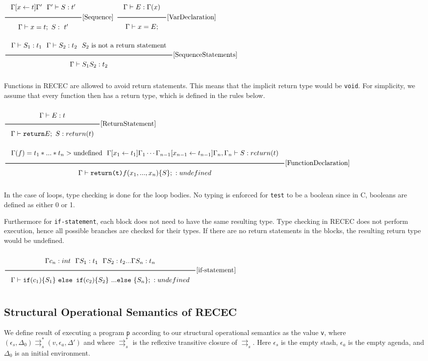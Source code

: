 \documentclass[a4paper]{article}
\newcommand{\RuleWithName}[3]{\genfrac{}{}{0.7pt}{}{{\setlength{\fboxrule}{0pt}\setlength{\fboxsep}{3mm}\fbox{$#1$}}}{{\setlength{\fboxrule}{0pt}\setlength{\fboxsep}{3mm}\fbox{$#2$}}}[\text{#3}]}
\begin{document}
\begin{center}
$\RuleWithName{\Gamma[x\leftarrow t]\Gamma' \ \  \Gamma' \vdash S : t'}{\Gamma \vdash x = t; \ S :\ t'}{Sequence}$
\hfill
$\RuleWithName{\Gamma \vdash E: \Gamma(x)}{\Gamma \vdash x = E;}{VarDeclaration}$
\hfill
$\RuleWithName{\Gamma \vdash S_1: t_1 \ \ \Gamma \vdash S_2: t_2 \ \ S_2 \ \text{is not a return statement}}{\Gamma \vdash S_1 S_2: t_2}{SequenceStatements}$

\end{center}

Functions in RECEC are allowed to avoid return statements. This means that the implicit return type would be \texttt{void}. For simplicity, we assume that every function then has a return type, which is defined in the rules below.

\begin{center}
$\RuleWithName{\Gamma \vdash E: t}{\Gamma \vdash \texttt{return} E; \ S : return(t)}{ReturnStatement}$
\hfill
$\RuleWithName{\Gamma(f) = t_1 * ... * t_n > \text{undefined} \ \ \Gamma[x_1\leftarrow t_1]\Gamma_1 \cdots \Gamma_{n-1}[x_{n-1}\leftarrow t_{n-1}]\Gamma_n, \Gamma_n \vdash S : return(t)}{\Gamma \vdash \texttt{return(t)}f(x_1, ..., x_n) \{S \}; \ : undefined}{FunctionDeclaration}$
\end{center}


In the case of loops, type checking is done for the loop bodies. No typing is enforced for \texttt{test} to be a boolean since in C, booleans are defined as either 0 or 1.

Furthermore for \texttt{if-statement}, each block does not need to have the same resulting type. Type checking in RECEC does not perform execution, hence all possible branches are checked for their types. If there are no return statements in the blocks, the resulting return type would be undefined. 

\begin{center}
    $\RuleWithName{\Gamma c_n : int  \ \ \Gamma S_1 : t_1 \ \ \Gamma S_2 : t_2 ... \Gamma S_n : t_n}{\Gamma \vdash \texttt{if} (c_1)\{S_1\}\ \texttt{else if} (c_2) \{S_2\}\ ... \texttt{else}\ \{S_n\};\ : undefined}{if-statement}$
\end{center}


\subsection{Structural Operational Semantics of RECEC}

We define result of executing a program \texttt{p} according to our structural operational semantics as the value \texttt{v}, where $(\epsilon_s, \Delta_0) \rightrightarrows^*_s (v, \epsilon_a, \Delta')$ and where $\rightrightarrows^*_s$ is the reflexive transitive closure of $\rightrightarrows_s$. Here $\epsilon_s$ is the empty stash, $\epsilon_a$ is the empty agenda, and $\Delta_0$ is an initial environment. 
\end{document}
